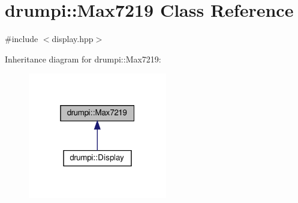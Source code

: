 \hypertarget{classdrumpi_1_1Max7219}{}\section{drumpi\+:\+:Max7219 Class Reference}
\label{classdrumpi_1_1Max7219}


{\ttfamily \#include $<$display.\+hpp$>$}



Inheritance diagram for drumpi\+:\+:Max7219\+:
\nopagebreak
\begin{figure}[H]
\begin{center}
\leavevmode
\includegraphics[width=172pt]{classdrumpi_1_1Max7219__inherit__graph}
\end{center}
\end{figure}
